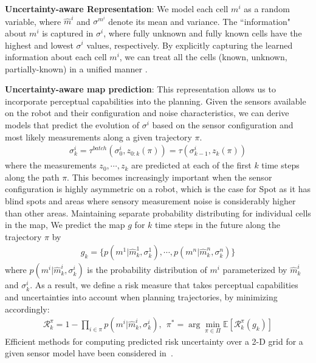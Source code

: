 \documentclass[letterpaper, 10pt, conference]{ieeeconf}      %
\newcommand{\ph}[1]{{\textbf{#1}:}} %
\newcommand{\rev}[1]{{\color{blue} #1 }} %
\begin{document}
\ph{Uncertainty-aware Representation}
We model each cell $m^i$ as a random variable, where $\hat{m}^i$ and $\sigma^{m^i}$ denote its mean and variance. The ``information" about $m^i$ is captured in $\sigma^i$, where fully unknown and fully known cells have the highest and lowest $\sigma^i$ values, respectively.  By explicitly capturing the learned information about each cell $m^i$, we can treat all the cells (known, unknown, partially-known) in a unified manner \rev{\cite{CRM}}. 

\ph{Uncertainty-aware map prediction}
This representation allows us to incorporate perceptual capabilities %
into the planning. Given the sensors available on the robot and their configuration and noise characteristics, we can derive models that predict the evolution of $\sigma^i$ based on the sensor configuration and most likely measurements along a given trajectory $\pi$. 
\begin{align}
 \sigma^i_k = \tau^{batch}( \sigma^i_0, z_{0:k}(\pi) )=\tau( \sigma^i_{k-1}, z_{k}(\pi) )
\end{align}
where the measurements $z_0,\cdots,z_k$ are predicted at each of the first $k$ time steps along the path $\pi$.
This becomes increasingly important when the sensor configuration is highly asymmetric on a robot, which is the case for Spot as it has blind spots and areas where sensory measurement noise is considerably higher than other areas.
Maintaining separate probability distributing for individual cells in the map, We predict the map $g$ for $k$ time steps in the future along the trajectory $\pi$ by 
\begin{align}
 g_k = \{p(m^1|\hat{m}^1_k,\sigma^1_k),\cdots,p(m^n|\hat{m}^n_k,\sigma^n_k)\}   
\end{align}
where $p(m^i|\hat{m}^i_k,\sigma^i_k)$ is the probability distribution of $m^i$ parameterized by $\hat{m}^i_k$ and $\sigma^i_k$.
As a result, we define a risk measure that takes perceptual capabilities and uncertainties into account when planning trajectories, by minimizing accordingly:
\begin{align}
\!\!\! \mathcal{R}_k^{\pi}=1-\prod_{i\in\pi}p(m^i|\hat{m}_k^{i},\sigma_k^{i}),~~
    \pi^* = \arg\min_{\pi\in\Pi}\mathbb{E}[\mathcal{R}_k^{\pi}(g_k)]
\end{align}
Efficient methods for computing predicted risk uncertainty over a 2-D grid for a given sensor model have been considered in~\cite{CRM}.
\end{document}
